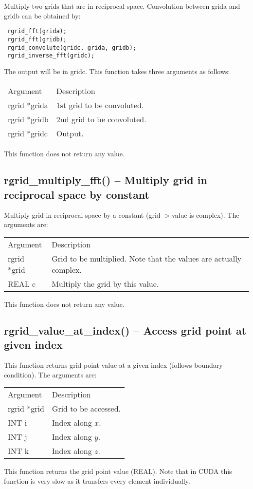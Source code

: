 \documentclass[12pt,letterpaper]{report}
\begin{document}
Multiply two grids that are in reciprocal space. Convolution between grida and gridb can be obtained by:
\begin{verbatim}
 rgrid_fft(grida);
 rgrid_fft(gridb);
 rgrid_convolute(gridc, grida, gridb);
 rgrid_inverse_fft(gridc);
\end{verbatim}
The output will be in gridc. This function takes three arguments as follows:
\begin{longtable}{p{} p{}}
Argument & Description\\
\cline{1-2}
rgrid *grida & 1st grid to be convoluted.\\ 
rgrid *gridb & 2nd grid to be convoluted.\\
rgrid *gridc & Output.\\
\end{longtable}
\noindent
This function does not return any value.

\subsection{rgrid\_multiply\_fft() -- Multiply grid in reciprocal space by constant}

Multiply grid in reciprocal space by a constant (grid-$>$value is complex). The arguments are:
\begin{longtable}{p{} p{}}
Argument & Description\\
\cline{1-2}
rgrid *grid & Grid to be multiplied. Note that the values are actually complex.\\
REAL c & Multiply the grid by this value.\\
\end{longtable}
\noindent
This function does not return any value.

\subsection{rgrid\_value\_at\_index() -- Access grid point at given index}

This function returns grid point value at a given index (follows boundary condition). The arguments are:
\begin{longtable}{p{} p{}}
Argument & Description\\
\cline{1-2}
rgrid *grid & Grid to be accessed.\\
INT i & Index along $x$.\\
INT j & Index along $y$.\\
INT k & Index along $z$.\\
\end{longtable}
\noindent
This function returns the grid point value (REAL). Note that in CUDA this function is very slow as it transfers every element individually.
\end{document}
